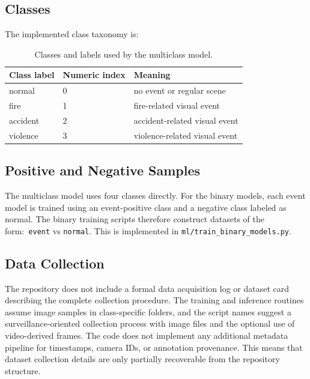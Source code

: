 \documentclass[11pt,a4paper]{article}
\begin{document}
\subsection{Classes}
The implemented class taxonomy is:
\begin{table}[h]
\centering
\begin{tabular}{lll}
\toprule
Class label & Numeric index & Meaning \\
\midrule
normal & 0 & no event or regular scene \\
fire & 1 & fire-related visual event \\
accident & 2 & accident-related visual event \\
violence & 3 & violence-related visual event \\
\bottomrule
\end{tabular}
\caption{Classes and labels used by the multiclass model.}
\label{tab:class-labels}
\end{table}

\subsection{Positive and Negative Samples}
The multiclass model uses four classes directly. For the binary models, each event model is trained using an event-positive class and a negative class labeled as normal. The binary training scripts therefore construct datasets of the form:\
\texttt{event} vs \texttt{normal}. This is implemented in \texttt{ml/train\_binary\_models.py}.

\subsection{Data Collection}
The repository does not include a formal data acquisition log or dataset card describing the complete collection procedure. The training and inference routines assume image samples in class-specific folders, and the script names suggest a surveillance-oriented collection process with image files and the optional use of video-derived frames. The code does not implement any additional metadata pipeline for timestamps, camera IDs, or annotation provenance. This means that dataset collection details are only partially recoverable from the repository structure.
\end{document}
